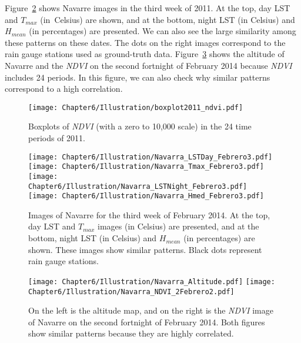 Figure~\ref{verde} shows Navarre images in the third week of 2011. At the top, day LST and $T_{max}$ (in~Celsius) are shown, and at the bottom, night LST (in Celsius) and $H_{mean}$ (in percentages) are presented. We can also see the large similarity among these patterns on these dates. The dots on the right images correspond to the rain gauge stations used as ground-truth data. Figure~\ref{ndvi} shows the altitude of Navarre and the \emph{NDVI} on the second fortnight of February 2014 because \emph{NDVI} includes 24 periods. In this figure, we can also check why similar patterns correspond to a high correlation.







\begin{figure}[ht]
 \centering
  \texttt{[image: Chapter6/Illustration/boxplot2011\_ndvi.pdf]}
 \caption{Boxplots of \emph{NDVI} (with a zero to 10,000 scale) in the 24 time periods of 2011.}
 \label{boxplot2011ndvi}
\end{figure}





\begin{figure}[ht]
 \centering
  \texttt{[image: Chapter6/Illustration/Navarra\_LSTDay\_Febrero3.pdf]}
  \texttt{[image: Chapter6/Illustration/Navarra\_Tmax\_Febrero3.pdf]}
  \texttt{[image: Chapter6/Illustration/Navarra\_LSTNight\_Febrero3.pdf]}
  \texttt{[image: Chapter6/Illustration/Navarra\_Hmed\_Febrero3.pdf]}

  \caption{Images of Navarre for the third week of February 2014. At the top, day LST and $T_{max}$ images (in Celsius) are presented, and at the bottom, night LST (in Celsius) and $H_{mean}$ (in percentages) are shown. These images show similar patterns. Black dots represent rain gauge stations.}\label{verde}
\end{figure}

\begin{figure}[ht]
 \centering
   \texttt{[image: Chapter6/Illustration/Navarra\_Altitude.pdf]}
   \texttt{[image: Chapter6/Illustration/Navarra\_NDVI\_2Febrero2.pdf]}
    \caption{On the left is the altitude map, and on the right is the \emph{NDVI} image of Navarre on the second fortnight of February 2014. Both figures show similar patterns because they are highly correlated.}\label{ndvi}
\end{figure}


